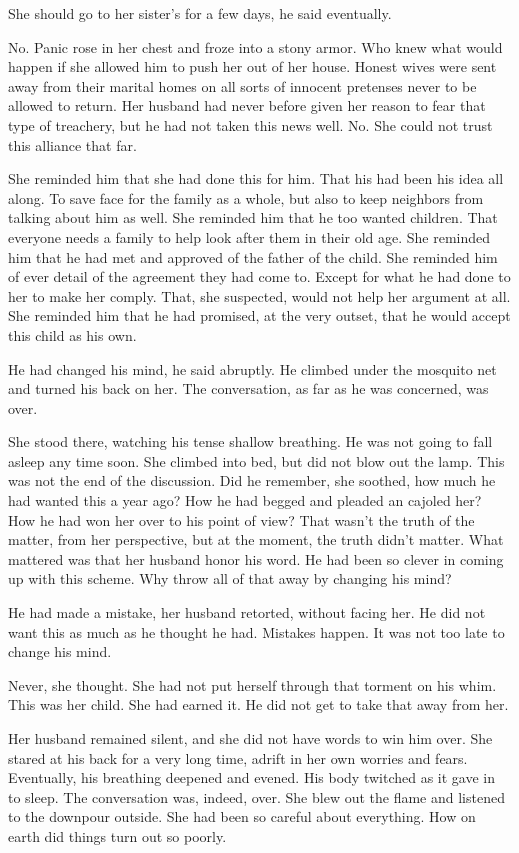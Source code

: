 \documentclass{article}
\begin{document}
She should go to her sister's for a few days, he said eventually.

No. Panic rose in her chest and froze into a stony armor. Who knew what would happen if she allowed him to push her out of her house. Honest wives were sent away from their marital homes on all sorts of innocent pretenses never to be allowed to return. Her husband had never before given her reason to fear that type of treachery, but he had not taken this news well. No. She could not trust this alliance that far. 

She reminded him that she had done this for him. That his had been his idea all along. To save face for the family as a whole, but also to keep neighbors from talking about him as well. She reminded him that he too wanted children. That everyone needs a family to help look after them in their old age. She reminded him that he had met and approved of the father of the child. She reminded him of ever detail of the agreement they had come to. Except for what he had done to her to make her comply. That, she suspected, would not help her argument at all. She reminded him that he had promised, at the very outset, that he would accept this child as his own. 

He had changed his mind, he said abruptly. He climbed under the mosquito net and turned his back on her. The conversation, as far as he was concerned, was over.

She stood there, watching his tense shallow breathing. He was not going to fall asleep any time soon. She climbed into bed, but did not blow out the lamp. This was not the end of the discussion. Did he remember, she soothed, how much he had wanted this a year ago? How he had begged and pleaded an cajoled her? How he had won her over to his point of view? That wasn't the truth of the matter, from her perspective, but at the moment, the truth didn't matter. What mattered was that her husband honor his word. He had been so clever in coming up with this scheme. Why throw all of that away by changing his mind?

He had made a mistake, her husband retorted, without facing her. He did not want this as much as he thought he had. Mistakes happen. It was not too late to change his mind. 

Never, she thought. She had not put herself through that torment on his whim. This was her child. She had earned it. He did not get to take that away from her.

Her husband remained silent, and she did not have words to win him over. She stared at his back for a very long time, adrift in her own worries and fears. Eventually, his breathing deepened and evened. His body twitched as it gave in to sleep. The conversation was, indeed, over. She blew out the flame and listened to the downpour outside. She had been so careful about everything. How on earth did things turn out so poorly. 
\end{document}
